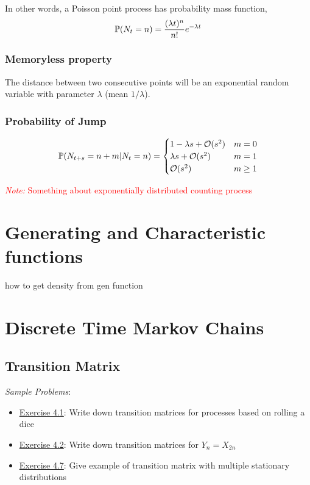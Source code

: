 \documentclass[12pt]{article}
\newcommand{\note}[1]{\textcolor{red}{\textit{Note:} #1}}
\begin{document}
In other words, a Poisson point process has probability mass function,
\begin{align*}
    \mathbb{P}(N_t=n) = \frac{(\lambda t)^n}{n!}e^{-\lambda t}
\end{align*}

\subsubsection{Memoryless property} 
The distance between two consecutive points will be an exponential random variable with parameter \( \lambda \) (mean \( 1/\lambda \)).

\subsubsection{Probability of Jump}
\begin{align*}
    \mathbb{P}(N_{t+s}=n+m | N_t =n) = 
    \begin{cases}
        1-\lambda s + \mathcal{O}(s^2) & m = 0 \\
        \lambda s + \mathcal{O}(s^2) & m = 1 \\
        \mathcal{O}(s^2) & m \geq 1
    \end{cases} 
\end{align*}

\note{Something about exponentially distributed counting process}


\pagebreak
\section{Generating and Characteristic functions}

how to get density from gen function



\pagebreak
\section{Discrete Time Markov Chains}
\subsection{Transition Matrix}
\textit{Sample Problems}: 
\begin{itemize}[nolistsep]
    \item \hyperref[Exercise 4.1]{Exercise 4.1}: Write down transition matrices for processes based on rolling a dice
    \item \hyperref[Exercise 4.2]{Exercise 4.2}: Write down transition matrices for \( Y_n = X_{2n} \)
    \item \hyperref[Exercise 4.7]{Exercise 4.7}: Give example of transition matrix with multiple stationary distributions
\end{itemize}
\end{document}
